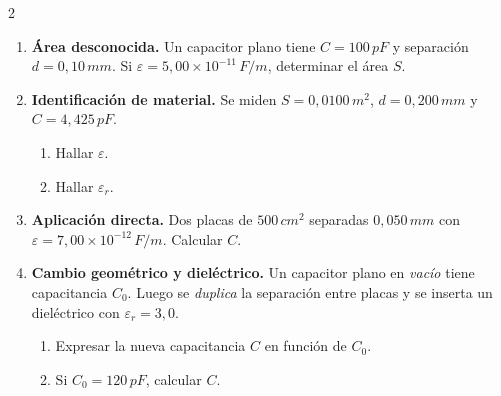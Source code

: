 \documentclass[a4paper,10pt]{article}
\begin{document}
\begin{multicols}{2}
\begin{enumerate}
\item \textbf{Área desconocida.} Un capacitor plano tiene \(C=100\,\si{pF}\) y separación \(d=0{,}10\,\si{mm}\). Si \(\varepsilon=5{,}00\times 10^{-11}\,\si{F/m}\), determinar el área \(S\).

\item \textbf{Identificación de material.} Se miden \(S=0{,}0100\,\si{m^2}\), \(d=0{,}200\,\si{mm}\) y \(C=4{,}425\,\si{pF}\).
\begin{enumerate}
\item Hallar \(\varepsilon\).
\item Hallar \(\varepsilon_r\).
\end{enumerate}

\item \textbf{Aplicación directa.} Dos placas de \(500\,\si{cm^2}\) separadas \(0{,}050\,\si{mm}\) con \(\varepsilon=7{,}00\times 10^{-12}\,\si{F/m}\). Calcular \(C\).

\item \textbf{Cambio geométrico y dieléctrico.} Un capacitor plano en \textit{vacío} tiene capacitancia \(C_0\).
Luego se \emph{duplica} la separación entre placas y se inserta un dieléctrico con \(\varepsilon_r=3{,}0\).
\begin{enumerate}
\item Expresar la nueva capacitancia \(C\) en función de \(C_0\).
\item Si \(C_0=120\,\si{pF}\), calcular \(C\).
\end{enumerate}

\end{enumerate}

\end{multicols}
\end{document}
